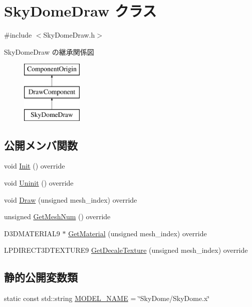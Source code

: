\hypertarget{class_sky_dome_draw}{}\section{Sky\+Dome\+Draw クラス}
\label{class_sky_dome_draw}


{\ttfamily \#include $<$Sky\+Dome\+Draw.\+h$>$}

Sky\+Dome\+Draw の継承関係図\begin{figure}[H]
\begin{center}
\leavevmode
\includegraphics[height=3.000000cm]{class_sky_dome_draw}
\end{center}
\end{figure}
\subsection*{公開メンバ関数}
\begin{DoxyCompactItemize}
\item 
void \mbox{\hyperlink{class_sky_dome_draw_a5b82e8b650a20dbc0b7ed720d1fb7fab}{Init}} () override
\item 
void \mbox{\hyperlink{class_sky_dome_draw_aee1c6b102a97033073b2559b8c2c328b}{Uninit}} () override
\item 
void \mbox{\hyperlink{class_sky_dome_draw_a89a1d08932cb19b43ebe42481944b6cc}{Draw}} (unsigned mesh\+\_\+index) override
\item 
unsigned \mbox{\hyperlink{class_sky_dome_draw_a3509ab1acfc388e652a8146b8ad027b5}{Get\+Mesh\+Num}} () override
\item 
D3\+D\+M\+A\+T\+E\+R\+I\+A\+L9 $\ast$ \mbox{\hyperlink{class_sky_dome_draw_a0afc2d0f6236bb3f9d4edea42737dc1c}{Get\+Material}} (unsigned mesh\+\_\+index) override
\item 
L\+P\+D\+I\+R\+E\+C\+T3\+D\+T\+E\+X\+T\+U\+R\+E9 \mbox{\hyperlink{class_sky_dome_draw_ac430b3aa2cd7470ac08ea5a9624bf429}{Get\+Decale\+Texture}} (unsigned mesh\+\_\+index) override
\end{DoxyCompactItemize}
\subsection*{静的公開変数類}
\begin{DoxyCompactItemize}
\item 
static const std\+::string \mbox{\hyperlink{class_sky_dome_draw_a366fd9d1040d77ddac71e335f10f2c29}{M\+O\+D\+E\+L\+\_\+\+N\+A\+ME}} = \char`\"{}Sky\+Dome/Sky\+Dome.\+x\char`\"{}
\end{DoxyCompactItemize}
